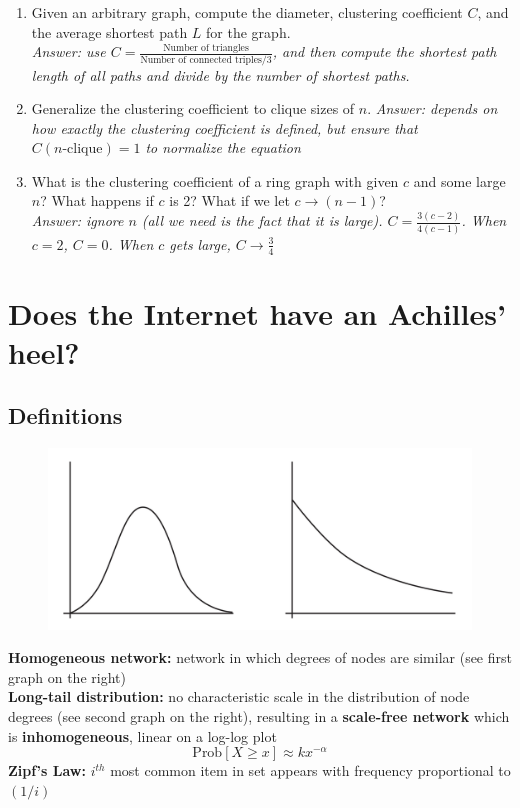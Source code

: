 \documentclass{article}
\begin{document}
\begin{enumerate}
\item Given an arbitrary graph, compute the diameter, clustering coefficient $C$, and the average shortest path $L$ for the graph. \\
\textit{Answer: use $ C = \frac{\text{Number of triangles}}{\text{Number of connected triples}/3} $, and then compute the shortest path length of all paths and divide by the number of shortest paths.}
\item Generalize the clustering coefficient to clique sizes of $n$.
\textit{Answer: depends on how exactly the clustering coefficient is defined, but ensure that $ C(n\text{-clique}) = 1$ to normalize the equation}
\item What is the clustering coefficient of a ring graph with given $c$ and some large $n$? What happens if $c$ is 2? What if we let $c \to (n-1)$? \\
\textit{Answer: ignore $n$ (all we need is the fact that it is large). $ C = \frac{3(c-2)}{4(c-1)} $. When $c = 2$, $C = 0$. When $c$ gets large, $C \to \frac{3}{4}$ }
\end{enumerate}

\section{Does the Internet have an Achilles' heel?}

\subsection{Definitions}

\begin{figure}
\includegraphics[width=\linewidth]{power_law.png}
\end{figure}

\textbf{Homogeneous network:} network in which degrees of nodes are similar (see first graph on the right) \\
\textbf{Long-tail distribution:} no characteristic scale in the distribution of node degrees (see second graph on the right), resulting in a \textbf{scale-free network} which is \textbf{inhomogeneous}, linear on a log-log plot
$$ \text{Prob}[X \geq x] \approx kx^{-\alpha} $$
\textbf{Zipf's Law:} $i^{th}$ most common item in set appears with
frequency proportional to $(1/i)$
\end{document}
